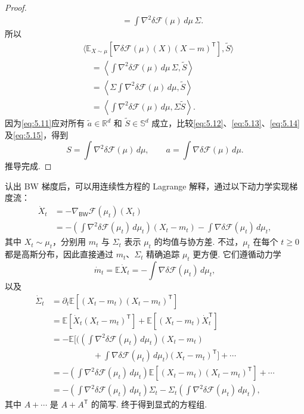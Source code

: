 \begin{proof}
$$\begin{aligned}
&\quad=\int\nabla^2\delta\mathcal F(\mu)\,d\mu\,\Sigma.
\end{aligned}
$$
所以
\begin{equation}\label{eq:5.15}
\begin{aligned}
&\langle\mathbb E_{X\sim\mu}[\nabla\delta\mathcal F(\mu)(X)(X-m)^{\mathsf T}],\widetilde S\rangle\\
&\quad=\left\langle\int\nabla^2\delta\mathcal F(\mu)\,d\mu\,\Sigma,\widetilde S\right\rangle\\
&\quad=\left\langle\Sigma\int\nabla^2\delta\mathcal F(\mu)\,d\mu,\widetilde S\right\rangle\\
&\quad=\left\langle\int\nabla^2\delta\mathcal F(\mu)\,d\mu,\Sigma\widetilde S\right\rangle.
\end{aligned}
\end{equation}
因为\eqref{eq:5.11}应对所有 $\widetilde a\in\mathbb R^d$ 和 $\widetilde S\in\mathbb S^d$ 成立，比较\eqref{eq:5.12}、\eqref{eq:5.13}、\eqref{eq:5.14}及\eqref{eq:5.15}，得到
$$
S=\int\nabla^2\delta\mathcal F(\mu)\,d\mu,
\qquad a=\int\nabla\delta\mathcal F(\mu)\,d\mu.
$$
推导完成.
\end{proof}

认出 BW 梯度后，可以用连续性方程的 Lagrange 解释，通过以下动力学实现梯度流：
$$
\begin{aligned}
\dot X_t&=-\nabla_{\mathsf{BW}}\mathcal F(\mu_t)(X_t)\\
&=-\left(\int\nabla^2\delta\mathcal F(\mu_t)\,d\mu_t\right)(X_t-m_t)
-\int\nabla\delta\mathcal F(\mu_t)\,d\mu_t,
\end{aligned}
$$
其中 $X_t\sim\mu_t$，分别用 $m_t$ 与 $\Sigma_t$ 表示 $\mu_t$ 的均值与协方差. 不过，$\mu_t$ 在每个 $t\geq0$ 都是高斯分布，因此直接通过 $m_t$、$\Sigma_t$ 精确追踪 $\mu_t$ 更方便. 它们遵循动力学
$$
\dot m_t=\mathbb E\dot X_t=-\int\nabla\delta\mathcal F(\mu_t)\,d\mu_t,
$$
以及
$$
\begin{aligned}
\dot\Sigma_t
&=\partial_t\mathbb E[(X_t-m_t)(X_t-m_t)^{\mathsf T}]\\
&=\mathbb E[\dot X_t(X_t-m_t)^{\mathsf T}]
+\mathbb E[(X_t-m_t)\dot X_t^{\mathsf T}]\\
&=-\mathbb E\Biggl[\Biggl(\left(\int\nabla^2\delta\mathcal F(\mu_t)\,d\mu_t\right)(X_t-m_t)\\
&\hspace{5em}+\int\nabla\delta\mathcal F(\mu_t)\,d\mu_t\Biggr)(X_t-m_t)^{\mathsf T}\Biggr]+\cdots\\
&=-\left(\int\nabla^2\delta\mathcal F(\mu_t)\,d\mu_t\right)
\mathbb E[(X_t-m_t)(X_t-m_t)^{\mathsf T}]+\cdots\\
&=-\left(\int\nabla^2\delta\mathcal F(\mu_t)\,d\mu_t\right)\Sigma_t
-\Sigma_t\left(\int\nabla^2\delta\mathcal F(\mu_t)\,d\mu_t\right),
\end{aligned}
$$
其中 $A+\cdots$ 是 $A+A^{\mathsf T}$ 的简写. 终于得到显式的方程组.

